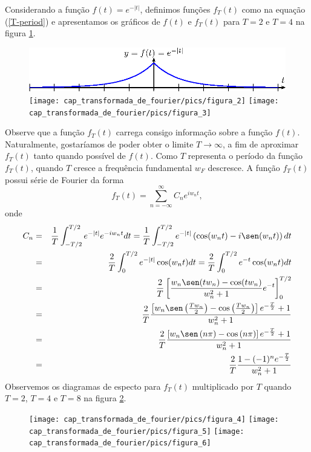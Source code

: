 \begin{ex}{\label{ex_Transf_1}} Considerando a função $f(t)=e^{-|t|}$, definimos funções $f_T(t)$ como na equação (\ref{T-period}) e apresentamos os gráficos de $f(t)$ e $f_T(t)$ para $T=2$ e $T=4$ na figura \ref{fig_T_tenda}.
\begin{figure}[!ht]
\begin{center}
\includegraphics[width=\textwidth]{cap_transformada_de_fourier/pics/figura_1}\vspace{10pt}
\texttt{[image: cap\_transformada\_de\_fourier/pics/figura\_2]}\vspace{10pt}
\texttt{[image: cap\_transformada\_de\_fourier/pics/figura\_3]}\end{center}
\caption{\label{fig_T_tenda}}
\end{figure}
Observe que a função $f_T(t)$ carrega consigo informação sobre a função $f(t)$. Naturalmente, gostaríamos de poder obter o limite $T\to \infty$, a fim de aproximar $f_T(t)$ tanto quando possível de $f(t)$. Como $T$ representa o período da função $f_T(t)$, quando $T$ cresce a frequência fundamental $w_F$ descresce. A função $f_T(t)$ possui série de Fourier da forma
\begin{equation}
f_T(t)=\sum_{n=-\infty}^\infty C_n e^{iw_n t},
\end{equation}
onde
\begin{eqnarray}
 \nonumber C_n&=&\frac{1}{T}\int_{-T/2}^{T/2}e^{-|t|}e^{-iw_nt}dt = \frac{1}{T}\int_{-T/2}^{T/2}e^{-|t|}\left(\cos(w_nt)-i\sen(w_nt)\right)dt\\
 \nonumber &=&\frac{2}{T}\int_{0}^{T/2}e^{-|t|}\cos(w_nt)dt= \frac{2}{T}\int_{0}^{T/2}e^{-t}\cos(w_nt)dt\\
 \nonumber &=&\frac{2}{T}\left[\frac{ w_n \sen(t w_n)-\cos(t w_n)}{w_n^2+1}e^{-t}\right]_0^{T/2}\\
 \nonumber &=&\frac{2}{T}\frac{ \left[w_n \sen\left(\frac{Tw_n}{2}\right)-\cos\left(\frac{Tw_n}{2}\right)\right]e^{-\frac{T}{2}}+1}{w_n^2+1}\\
 \nonumber &=&\frac{2}{T}\frac{ \left[w_n \sen\left(n\pi\right)-\cos\left(n\pi\right)\right]e^{-\frac{T}{2}}+1}{w_n^2+1}\\
&=&\frac{2}{T}\frac{ 1-(-1)^ne^{-\frac{T}{2}}}{w_n^2+1}      {\label{TCn}}
 \end{eqnarray}
Observemos os diagramas de especto para $f_T(t)$ multiplicado por $T$ quando $T=2$, $T=4$ e $T=8$ na figura \ref{dia_espc_tenda}.
 \begin{figure}[!ht]
\texttt{[image: cap\_transformada\_de\_fourier/pics/figura\_4]}
\texttt{[image: cap\_transformada\_de\_fourier/pics/figura\_5]}
\texttt{[image: cap\_transformada\_de\_fourier/pics/figura\_6]}\caption{\label{dia_espc_tenda}}
\end{figure}
 \end{ex}
